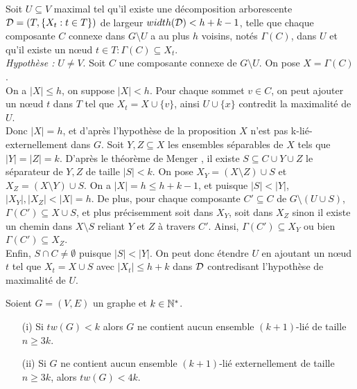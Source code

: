 	Soit $U \subseteq V$ maximal tel qu'il existe une décomposition
	arborescente ${\cal D} = (T,\{X_t : t \in T\})$ de largeur 
	$width({\cal D}) < h + k - 1$,
	telle que chaque composante $C$ connexe dans $G \setminus U$ a 
	au plus $h$ voisins, notés $\Gamma(C)$, dans $U$ et qu'il
	existe un n\oe ud $t \in T : \Gamma(C) \subseteq X_t$.
	\\
	{\em Hypothèse :} $U \neq V$.
	Soit $C$ une composante connexe de $G \setminus U$.
	On pose $X = \Gamma(C)$.
	\\
	On a $|X| \leq h$, on suppose $|X| < h$.
	Pour chaque sommet $v \in C$, on peut ajouter un n\oe ud $t$ dans
	$T$ tel que $X_t = X \cup \{v\}$, ainsi $U \cup \{x\}$ 
	contredit la maximalité de $U$.
	\\
	Donc $|X| = h$, et d'après l'hypothèse de la proposition
	$X$ n'est pas k-lié-externellement dans $G$.
	Soit $Y,Z \subseteq X$ les ensembles séparables de $X$ tels que
	$|Y| = |Z| = k$.
	D'après le théorème de Menger \cite{menger}, il existe
	$S \subseteq C \cup Y \cup Z$ le séparateur de $Y,Z$ de taille $|S| < k$.
	On pose $X_Y = (X\setminus Z) \cup S$ et $X_Z = (X \setminus Y) \cup S$.
	On a $|X| = h \leq h + k -1$, et puisque $|S| < |Y|$, $|X_Y|,|X_Z| < |X| = h$.
	De plus, pour chaque composante $C' \subseteq C$ de $G \setminus (U\cup S)$,
	$\Gamma(C') \subseteq X \cup S$, et plus précisemment soit dans $X_Y$, soit dans
	$X_Z$ sinon il existe un chemin dans $X \setminus S$ reliant $Y$ et $Z$ à travers
	$C'$.
	Ainsi, $\Gamma(C') \subseteq X_Y$ ou bien $\Gamma(C') \subseteq X_Z$.
	\\
	Enfin, $S \cap C \neq \emptyset$ puisque $|S| < |Y|$.
	On peut donc étendre $U$ en ajoutant un n\oe ud $t$ tel que
	$X_t = X \cup S$ avec $|X_t| \leq h + k$ dans ${\cal D}$ contredisant l'hypothèse de maximalité
	de $U$.
	
\label{propdiestel}
	Soient $G = (V,E)$ un graphe et $k \in \mathbb{N}^*$.
	\begin{itemize}
		\item[(i)] Si $tw(G) < k$ alors $G$ ne contient aucun ensemble
		$(k+1)$-lié de taille $n \geq 3k$.
		\item[(ii)] Si $G$ ne contient aucun ensemble $(k+1)$-lié externellement
		de taille $n \geq 3k$, alors $tw(G) < 4k$.
	\end{itemize}

